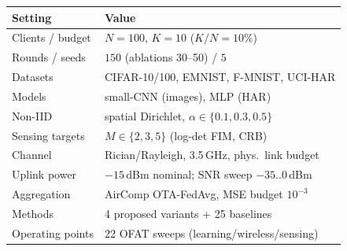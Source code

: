 \begin{tabular}{@{}l l@{}}
\toprule
Setting & Value \\
\midrule
Clients / budget & $N=100$, $K=10$ ($K/N=10\%$) \\
Rounds / seeds & $150$ (ablations 30--50) / $5$ \\
Datasets & CIFAR-10/100, EMNIST, F-MNIST, UCI-HAR \\
Models & small-CNN (images), MLP (HAR) \\
Non-IID & spatial Dirichlet, $\alpha\in\{0.1,0.3,0.5\}$ \\
Sensing targets & $M\in\{2,3,5\}$ (log-det FIM, CRB) \\
Channel & Rician/Rayleigh, 3.5\,GHz, phys.\ link budget \\
Uplink power & $-15$\,dBm nominal; SNR sweep $-35..0$\,dBm \\
Aggregation & AirComp OTA-FedAvg, MSE budget $10^{-3}$ \\
Methods & 4 proposed variants + 25 baselines \\
Operating points & 22 OFAT sweeps (learning/wireless/sensing) \\
\bottomrule
\end{tabular}